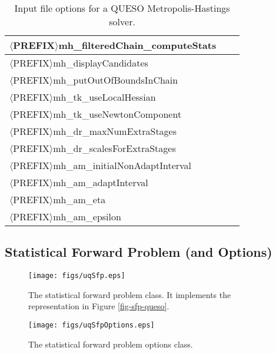 \begin{table}[!h]
\begin{center}
\begin{tabular}{|l|c|c|}
\hline
$\langle$PREFIX$\rangle$mh\_filteredChain\_computeStats         &         &             \\
\hline
$\langle$PREFIX$\rangle$mh\_displayCandidates                   &         &             \\
\hline
$\langle$PREFIX$\rangle$mh\_putOutOfBoundsInChain               &         &             \\
\hline
$\langle$PREFIX$\rangle$mh\_tk\_useLocalHessian                 &         &             \\
\hline
$\langle$PREFIX$\rangle$mh\_tk\_useNewtonComponent              &         &             \\
\hline
$\langle$PREFIX$\rangle$mh\_dr\_maxNumExtraStages               &         &             \\
\hline
$\langle$PREFIX$\rangle$mh\_dr\_scalesForExtraStages            &         &             \\
\hline
$\langle$PREFIX$\rangle$mh\_am\_initialNonAdaptInterval         &         &             \\
\hline
$\langle$PREFIX$\rangle$mh\_am\_adaptInterval                   &         &             \\
\hline
$\langle$PREFIX$\rangle$mh\_am\_eta                             &         &             \\
\hline
$\langle$PREFIX$\rangle$mh\_am\_epsilon                         &         &             \\
\hline
\end{tabular}
\end{center}
\caption{
Input file options for a QUESO Metropolis-Hastings solver.
}
\label{tab-metropolis-hastings-options}
\end{table}

\clearpage
\subsection{Statistical Forward Problem (and Options)}

\begin{figure}[h!]
\centerline{
\texttt{[image: figs/uqSfp.eps]}
}
\caption{
The statistical forward problem class. It implements the representation in Figure \ref{fig-sfp-queso}.
}
\label{fig-sfp-class}
\end{figure}

\begin{figure}[h!]
\begin{center}
\texttt{[image: figs/uqSfpOptions.eps]}
\end{center}
\caption{
The statistical forward problem options class.
}
\label{fig-sfp-options-class}
\end{figure}

